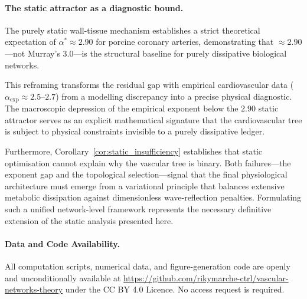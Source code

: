 \documentclass[11pt,a4paper]{article}
\theoremstyle{remark}
\begin{document}
\paragraph{The static attractor as a diagnostic bound.}
The purely static wall-tissue mechanism establishes a strict theoretical
expectation of $\alpha^* \approx 2.90$ for porcine coronary arteries,
demonstrating that $\approx 2.90$---not Murray's $3.0$---is the
structural baseline for purely dissipative biological networks.

This reframing transforms the residual gap with empirical cardiovascular
data ($\alpha_{\exp} \approx 2.5$--$2.7$) from a modelling discrepancy
into a precise physical diagnostic. The macroscopic depression of the
empirical exponent below the $2.90$ static attractor serves as an
explicit mathematical signature that the cardiovascular tree is subject
to physical constraints invisible to a purely dissipative ledger.

Furthermore, Corollary~\ref{cor:static_insufficiency} establishes that
static optimisation cannot explain why the vascular tree is binary.
Both failures---the exponent gap and the topological selection---signal
that the final physiological architecture must emerge from a variational
principle that balances extensive metabolic dissipation against
dimensionless wave-reflection penalties. Formulating such a unified
network-level framework represents the necessary definitive extension
of the static analysis presented here.

\paragraph*{Data and Code Availability.}
All computation scripts, numerical data, and figure-generation code are openly
and unconditionally available at
\url{https://github.com/rikymarche-ctrl/vascular-networks-theory} under the CC BY 4.0
Licence. No access request is required.



\end{document}
